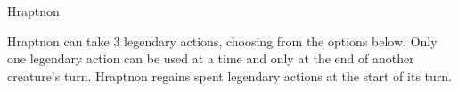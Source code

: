 \documentclass[10pt,a4paper,twoside,twocolumn,openany,bg=print,nodeprecatedcode]{dndbook}
\begin{document}
\begin{DndMonster}[float*=t]{Hraptnon}
\par
{}
Hraptnon can take 3 legendary actions, choosing from the options below. Only one legendary action can be used at a time and only at the end of another creature's turn. Hraptnon regains spent legendary actions at the start of its turn.
\begin{DndMonsterLegendaryActions}
\end{DndMonsterLegendaryActions}
\end{DndMonster}
\end{document}

